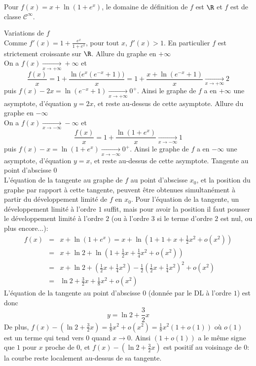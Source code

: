 {\begin{enumerate}
{\begin{center}
\end{center}
Pour $f(x)=x+\ln(1+e^x)$, le domaine de définition de $f$ est $\R$ et $f$ est de classe $\mathcal{C}^\infty$.
\begin{itemize}
Variations de $f$\\
Comme $f'(x)=1+\frac{e^x}{1+e^x}$, pour tout $x$, $f'(x)>1$. En particulier $f$ est strictement croissante sur $\R$.
Allure du graphe en $+\infty$\\
On a $f(x)\xrightarrow[x\to +\infty]{}+\infty$ et
$$\frac{f(x)}{x}=1+\frac{\ln\big( e^x (e^{-x}+1)\big)}{x}=1+\frac{x+\ln(e^{-x}+1)}{x}\xrightarrow[x\to +\infty]{}2$$
puis $f(x)-2x=\ln(e^{-x}+1)\xrightarrow[x\to +\infty]{}0^+$. Ainsi le graphe de $f$ a en $+\infty$ une asymptote, d'équation $y=2x$, et reste au-dessus de cette asymptote.
Allure du graphe en $-\infty$\\
On a $f(x)\xrightarrow[x\to -\infty]{}-\infty$ et
$$\frac{f(x)}{x}=1+\frac{\ln(1+e^x)}{x}\xrightarrow[x\to -\infty]{}1$$
puis $f(x)-x=\ln(1+e^{x})\xrightarrow[x\to -\infty]{}0^+$. Ainsi le graphe de $f$ 
a en $-\infty$ une asymptote, d'équation $y=x$, et reste au-dessus de cette asymptote.
Tangente au point d'abscisse $0$\\
L'équation de la tangente au graphe de $f$ au point d'abscisse $x_0$, 
et la position du graphe par rapport à cette tangente, peuvent \^etre 
obtenues simultanément à partir du développement limité de $f$ en $x_0$. 
Pour l'équation de la tangente, un développement limité à l'ordre $1$ suffit, 
mais pour avoir la position il faut pousser le développement limité à l'ordre $2$ 
(ou à l'ordre $3$ si le terme d'ordre $2$ est nul, ou plus encore...):
\begin{eqnarray*}
f(x)&=&x+\ln(1+e^x)=x+\ln\left(1+1+x+\frac{1}{2}x^2+o(x^2)\right)\\
 &=&x+\ln 2+\ln\left(1+\frac{1}{2}x+\frac{1}{4}x^2+o(x^2)\right)\\
 &=&x+\ln 2+\left(\frac{1}{2}x+\frac{1}{4}x^2\right)-\frac{1}{2}\left(\frac{1}{2}x+\frac{1}{4}x^2\right)^2+o(x^2)\\
 &=&\ln 2+\frac{3}{2}x+\frac{1}{8}x^2+o(x^2)
\end{eqnarray*}
L'équation de la tangente au point d'abscisse $0$ (donnée par le DL à l'ordre $1$) est donc 
$$y=\ln 2+\frac{3}{2}x$$ 
De plus, $f(x)-\left(\ln 2+\frac{3}{2}x\right)=\frac{1}{8}x^2+o(x^2)=\frac{1}{8}x^2(1+o(1))$
où $o(1)$ est un terme qui tend vers $0$ quand $x\to 0$. Ainsi $(1+o(1))$ a le m\^eme signe que $1$ 
pour $x$ proche de $0$, et $f(x)-\left(\ln 2+\frac{3}{2}x\right)$ est positif au voisinage de $0$: 
la courbe reste localement au-dessus de sa tangente.
\end{itemize}

}
\end{enumerate}}
